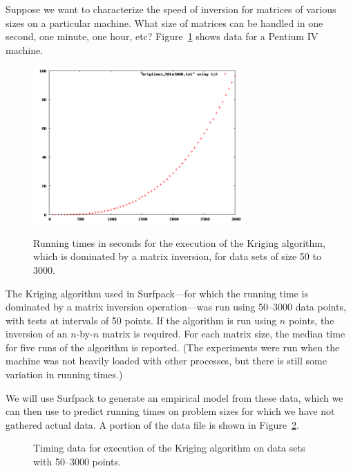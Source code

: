 \documentclass{article}
\begin{document}
Suppose we want to characterize the speed of inversion for matrices of various
sizes on a particular machine.  What size of matrices can be handled in one
second, one minute, one hour, etc?  Figure~\ref{fig:kriging_times} shows data for a Pentium IV machine.  

\begin{figure}[htbp]
  \centering 
  \includegraphics[width=8cm]{TimingMatrixOp/kriging_times_50to3000.png}
  \label{fig:kriging_times}
  \caption {Running times in seconds for the execution of the Kriging algorithm, which is dominated by a matrix inversion, for data sets of size 50 to 3000.} 
\end{figure}

The Kriging algorithm used in Surfpack---for which the running time is
dominated by a matrix inversion operation---was run using 50--3000 data points,
with tests at intervals of 50 points.  If the algorithm is run using $n$
points, the inversion of an $n$-by-$n$ matrix is required.  For each matrix
size, the median time for five runs of the algorithm is reported.  (The
experiments were run when the machine was not heavily loaded with other
processes, but there is still some variation in running times.)

We will use Surfpack to generate an empirical model from these data, which we
can then use to predict running times on problem sizes for which we have not
gathered actual data.  A portion of the data file is shown in Figure~\ref{fig:timing_data_extract}.

\begin{figure}[htbp]
  \centering
  \begin{bigbox}
	\begin{small}
		
 	\end{small}
  \end{bigbox}
  \label{fig:timing_data_extract}
  \caption{ Timing data for execution of the Kriging algorithm on data sets with 50--3000 points.}
\end{figure}
\end{document}
